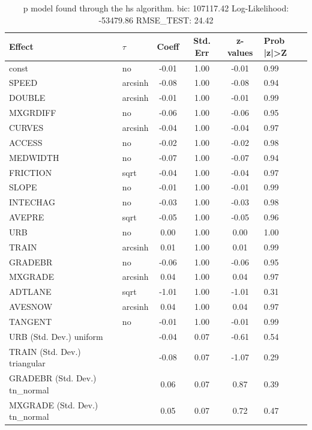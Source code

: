 \begin{table}
	\caption{p model found through the hs algorithm. bic: 107117.42 Log-Likelihood: -53479.86 RMSE_TEST: 24.42}
	\begin{center}
		\begin{tabular}{|l|l|c|c|c|l|}
			\hline
			Effect & $\tau$ & Coeff & Std. Err & z-values & Prob |z|>Z \\
			\hline
			const & no & -0.01 & 1.00 & -0.01 & 0.99 \\
			\hline
			SPEED & arcsinh & -0.08 & 1.00 & -0.08 & 0.94 \\
			\hline
			DOUBLE & arcsinh & -0.01 & 1.00 & -0.01 & 0.99 \\
			\hline
			MXGRDIFF & no & -0.06 & 1.00 & -0.06 & 0.95 \\
			\hline
			CURVES & arcsinh & -0.04 & 1.00 & -0.04 & 0.97 \\
			\hline
			ACCESS & no & -0.02 & 1.00 & -0.02 & 0.98 \\
			\hline
			MEDWIDTH & no & -0.07 & 1.00 & -0.07 & 0.94 \\
			\hline
			FRICTION & sqrt & -0.04 & 1.00 & -0.04 & 0.97 \\
			\hline
			SLOPE & no & -0.01 & 1.00 & -0.01 & 0.99 \\
			\hline
			INTECHAG & no & -0.03 & 1.00 & -0.03 & 0.98 \\
			\hline
			AVEPRE & sqrt & -0.05 & 1.00 & -0.05 & 0.96 \\
			\hline
			URB & no & 0.00 & 1.00 & 0.00 & 1.00 \\
			\hline
			TRAIN & arcsinh & 0.01 & 1.00 & 0.01 & 0.99 \\
			\hline
			GRADEBR & no & -0.06 & 1.00 & -0.06 & 0.95 \\
			\hline
			MXGRADE & arcsinh & 0.04 & 1.00 & 0.04 & 0.97 \\
			\hline
			ADTLANE & sqrt & -1.01 & 1.00 & -1.01 & 0.31 \\
			\hline
			AVESNOW & arcsinh & 0.04 & 1.00 & 0.04 & 0.97 \\
			\hline
			TANGENT & no & -0.01 & 1.00 & -0.01 & 0.99 \\
			\hline
			URB (Std. Dev.) uniform &  & -0.04 & 0.07 & -0.61 & 0.54 \\
			\hline
			TRAIN (Std. Dev.) triangular &  & -0.08 & 0.07 & -1.07 & 0.29 \\
			\hline
			GRADEBR (Std. Dev.) tn_normal &  & 0.06 & 0.07 & 0.87 & 0.39 \\
			\hline
			MXGRADE (Std. Dev.) tn_normal &  & 0.05 & 0.07 & 0.72 & 0.47 \\

\end{tabular}
\end{center}
\end{table}
